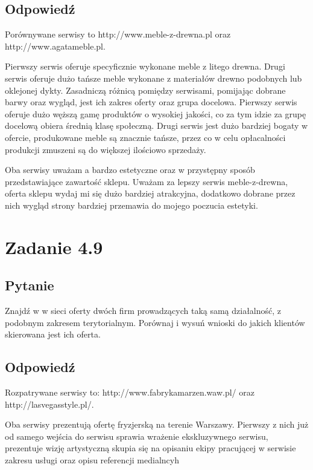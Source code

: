 \documentclass[paper=a4, fontsize=11pt]{scrartcl} %
\numberwithin{equation}{section} %
\numberwithin{figure}{section} %
\numberwithin{table}{section} %
\begin{document}
\subsection {Odpowiedź}

Porównywane serwisy to http://www.meble-z-drewna.pl oraz http://www.agatameble.pl.

Pierwszy serwis oferuje specyficznie wykonane meble z litego drewna. Drugi serwis oferuje
dużo tańsze meble wykonane z materiałów drewno podobnych lub oklejonej dykty. 
Zasadniczą różnicą pomiędzy serwisami, pomijając dobrane barwy oraz wygląd, jest ich zakres oferty
oraz grupa docelowa. Pierwszy serwis oferuje dużo węższą gamę produktów o wysokiej jakości, co za tym
idzie za grupę docelową obiera średnią klasę społeczną. Drugi serwis jest dużo bardziej bogaty w ofercie,
produkowane meble są znacznie tańsze, przez co w celu opłacalności produkcji zmuszeni są do większej
ilościowo sprzedaży.

Oba serwisy uważam a bardzo estetyczne oraz w przystępny sposób przedstawiające zawartość sklepu.
Uważam za lepszy serwis meble-z-drewna, oferta sklepu wydaj mi się dużo bardziej atrakcyjna, dodatkowo
dobrane przez nich wygląd strony bardziej przemawia do mojego poczucia estetyki.


\section{Zadanie 4.9}

\subsection {Pytanie}

Znajdź w w sieci oferty dwóch firm prowadzących taką samą działalność, z podobnym zakresem terytorialnym.
Porównaj i wysuń wnioski do jakich klientów skierowana jest ich oferta.

\subsection {Odpowiedź}

Rozpatrywane serwisy to: http://www.fabrykamarzen.waw.pl/ oraz http://lasvegasstyle.pl/.

Oba serwisy prezentują ofertę fryzjerską na terenie Warszawy. Pierwszy z nich już od samego wejścia do serwisu
sprawia wrażenie ekskluzywnego serwisu, prezentuje wizję artystyczną skupia się na opisaniu ekipy pracującej w serwisie
zakresu usługi oraz opisu referencji medialncyh
\end{document}
